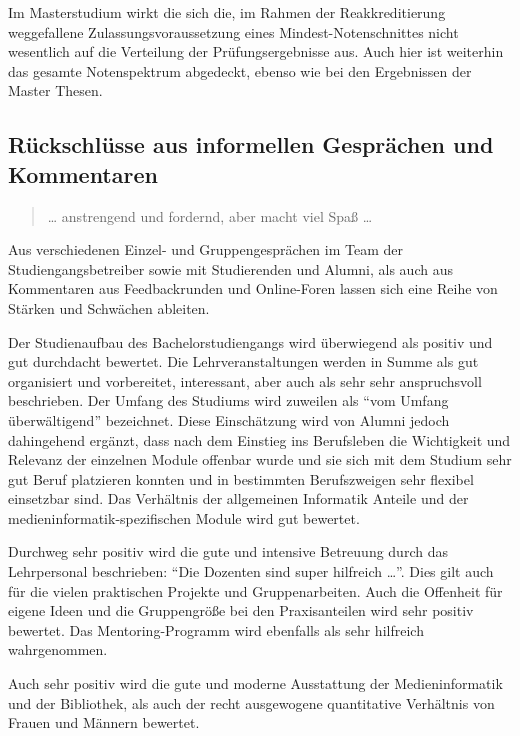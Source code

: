 Im Masterstudium wirkt die sich die, im Rahmen der Reakkreditierung
weggefallene Zulassungsvoraussetzung eines Mindest-Notenschnittes nicht
wesentlich auf die Verteilung der Prüfungsergebnisse aus. Auch hier ist
weiterhin das gesamte Notenspektrum abgedeckt, ebenso wie bei den
Ergebnissen der Master Thesen.

\subsection{Rückschlüsse aus informellen Gesprächen und
Kommentaren}\label{ruxfcckschluxfcsse-aus-informellen-gespruxe4chen-und-kommentaren}

\begin{quote}
\ldots{} anstrengend und fordernd, aber macht viel Spaß \ldots{}
\end{quote}

Aus verschiedenen Einzel- und Gruppengesprächen im Team der
Studiengangsbetreiber sowie mit Studierenden und Alumni, als auch aus
Kommentaren aus Feedbackrunden und Online-Foren lassen sich eine Reihe
von Stärken und Schwächen ableiten.

Der Studienaufbau des Bachelorstudiengangs wird überwiegend als positiv
und gut durchdacht bewertet. Die Lehrveranstaltungen werden in Summe als
gut organisiert und vorbereitet, interessant, aber auch als sehr sehr
anspruchsvoll beschrieben. Der Umfang des Studiums wird zuweilen als
``vom Umfang überwältigend'' bezeichnet. Diese Einschätzung wird von
Alumni jedoch dahingehend ergänzt, dass nach dem Einstieg ins
Berufsleben die Wichtigkeit und Relevanz der einzelnen Module offenbar
wurde und sie sich mit dem Studium sehr gut Beruf platzieren konnten und
in bestimmten Berufszweigen sehr flexibel einsetzbar sind. Das
Verhältnis der allgemeinen Informatik Anteile und der
medieninformatik-spezifischen Module wird gut bewertet.

Durchweg sehr positiv wird die gute und intensive Betreuung durch das
Lehrpersonal beschrieben: ``Die Dozenten sind super hilfreich
\ldots{}''. Dies gilt auch für die vielen praktischen Projekte und
Gruppenarbeiten. Auch die Offenheit für eigene Ideen und die
Gruppengröße bei den Praxisanteilen wird sehr positiv bewertet. Das
Mentoring-Programm wird ebenfalls als sehr hilfreich wahrgenommen.

Auch sehr positiv wird die gute und moderne Ausstattung der
Medieninformatik und der Bibliothek, als auch der recht ausgewogene
quantitative Verhältnis von Frauen und Männern bewertet.

